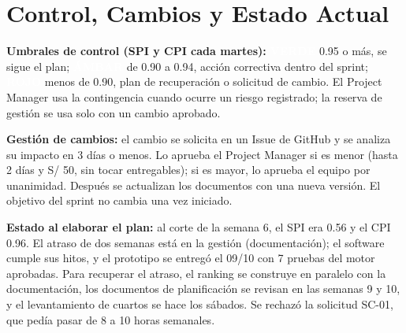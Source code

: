 \documentclass[11pt,a4paper]{article}
\newcommand{\etiqueta}[2]{{\setlength{\fboxsep}{2pt}\colorbox{#1}{\textcolor{white}{\scriptsize\bfseries #2}}}}
\begin{document}
\section{Control, Cambios y Estado Actual}
{\small
\noindent\textbf{Umbrales de control (SPI y CPI cada martes):} \etiqueta{Rama4}{VERDE} 0.95 o más, se sigue el plan; \etiqueta{SevMedia}{ÁMBAR} de 0.90 a 0.94, acción correctiva dentro del sprint; \etiqueta{SevAlta}{ROJO} menos de 0.90, plan de recuperación o solicitud de cambio. El Project Manager usa la contingencia cuando ocurre un riesgo registrado; la reserva de gestión se usa solo con un cambio aprobado.

\vspace{0.1cm}
\noindent\textbf{Gestión de cambios:} el cambio se solicita en un Issue de GitHub y se analiza su impacto en 3 días o menos. Lo aprueba el Project Manager si es menor (hasta 2 días y S/ 50, sin tocar entregables); si es mayor, lo aprueba el equipo por unanimidad. Después se actualizan los documentos con una nueva versión. El objetivo del sprint no cambia una vez iniciado.

\vspace{0.1cm}
\noindent\textbf{Estado al elaborar el plan:} al corte de la semana 6, el SPI era 0.56 y el CPI 0.96. El atraso de dos semanas está en la gestión (documentación); el software cumple sus hitos, y el prototipo se entregó el 09/10 con 7 pruebas del motor aprobadas. Para recuperar el atraso, el ranking se construye en paralelo con la documentación, los documentos de planificación se revisan en las semanas 9 y 10, y el levantamiento de cuartos se hace los sábados. Se rechazó la solicitud SC-01, que pedía pasar de 8 a 10 horas semanales.
}

\end{document}
